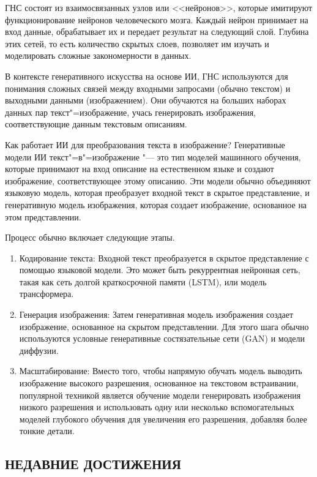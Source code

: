 \documentclass[referat]{SCWorks}
\begin{document}
ГНС состоят из взаимосвязанных узлов или <<нейронов>>, которые имитируют функционирование нейронов человеческого мозга. Каждый нейрон принимает на вход данные, обрабатывает их и передает результат на следующий слой. Глубина этих сетей, то есть количество скрытых слоев, позволяет им изучать и моделировать сложные закономерности в данных.

В контексте генеративного искусства на основе ИИ, ГНС используются для понимания сложных связей между входными запросами (обычно текстом) и выходными данными (изображением). Они обучаются на больших наборах данных пар текст"=изображение, учась генерировать изображения, соответствующие данным текстовым описаниям.

Как работает ИИ для преобразования текста в изображение?
Генеративные модели ИИ текст"=в"=изображение "--- это тип моделей машинного обучения, которые принимают на вход описание на естественном языке и создают изображение, соответствующее этому описанию. Эти модели обычно объединяют языковую модель, которая преобразует входной текст в скрытое представление, и генеративную модель изображения, которая создает изображение, основанное на этом представлении.

Процесс обычно включает следующие этапы.

\begin{enumerate}
    \item Кодирование текста: Входной текст преобразуется в скрытое представление с помощью языковой модели. Это может быть рекуррентная нейронная сеть, такая как сеть долгой краткосрочной памяти (LSTM), или модель трансформера.
    \item Генерация изображения: Затем генеративная модель изображения создает изображение, основанное на скрытом представлении. Для этого шага обычно используются условные генеративные состязательные сети (GAN) и модели диффузии.
    \item Масштабирование: Вместо того, чтобы напрямую обучать модель выводить изображение высокого разрешения, основанное на текстовом встраивании, популярной техникой является обучение модели генерировать изображения низкого разрешения и использовать одну или несколько вспомогательных моделей глубокого обучения для увеличения его разрешения, добавляя более тонкие детали.
\end{enumerate}

\subsection{НЕДАВНИЕ ДОСТИЖЕНИЯ}
\end{document}
